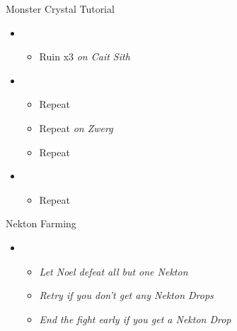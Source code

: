 \begin{battle}{Monster Crystal Tutorial}
	\begin{itemize}
		\item \first
		      \begin{itemize}
			      \item Ruin x3 \textit{on Cait Sith}
		      \end{itemize}
		\item \second
		      \begin{itemize}
			      \item Repeat
			      \item Repeat \textit{on Zwerg}
			      \item Repeat
		      \end{itemize}
		\item \first
		      \begin{itemize}
			      \item Repeat
		      \end{itemize}
	\end{itemize}
\end{battle}

\begin{battle}{Nekton Farming}
	\begin{itemize}
		\item \first
		      \begin{itemize}
			      \item \textit{Let Noel defeat all but one Nekton}
			      \item \textit{Retry if you don't get any Nekton Drops}
			      \item \textit{End the fight early if you get a Nekton Drop}
		      \end{itemize}
	\end{itemize}
\end{battle}



